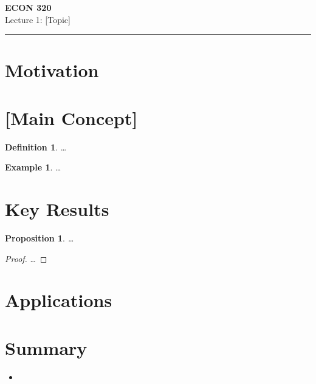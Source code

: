 \documentclass[11pt]{article}
\newtheorem{proposition}[theorem]{Proposition}
\theoremstyle{definition}
\newtheorem{definition}[theorem]{Definition}
\newtheorem{example}[theorem]{Example}
\theoremstyle{remark}
\begin{document}
\begin{center}
  {\LARGE\bfseries ECON 320}\\[0.4em]
  {\large Lecture 1: [Topic]}
\end{center}
\medskip\hrule\medskip

\section{Motivation}

\section{[Main Concept]}

\begin{definition}
  \ldots
\end{definition}

\begin{example}
  \ldots
\end{example}

\section{Key Results}

\begin{proposition}
  \ldots
\end{proposition}

\begin{proof}
  \ldots
\end{proof}

\section{Applications}

\section{Summary}

\begin{itemize}
  \item
\end{itemize}
\end{document}
